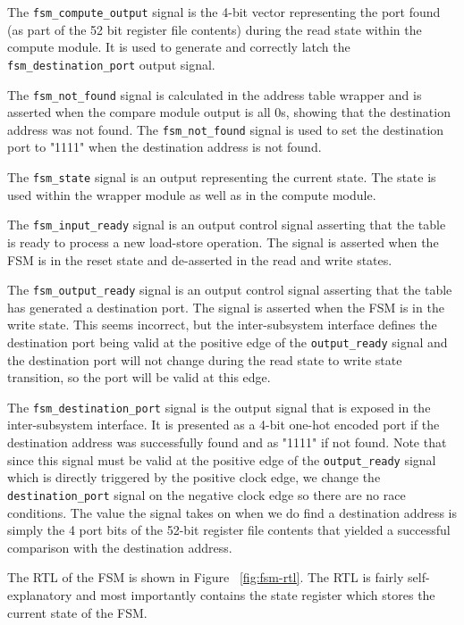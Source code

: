 \documentclass{article}
\begin{document}
The \texttt{fsm\_compute\_output} signal is the 4-bit vector representing the port found (as part of the 52 bit register file contents) during the read state within the compute module. It is used to generate and correctly latch the \texttt{fsm\_destination\_port} output signal.

The \texttt{fsm\_not\_found} signal is calculated in the address table wrapper and is asserted when the compare module output is all 0s, showing that the destination address was not found. The \texttt{fsm\_not\_found} signal is used to set the destination port to "1111" when the destination address is not found.

The \texttt{fsm\_state} signal is an output representing the current state. The state is used within the wrapper module as well as in the compute module.

The \texttt{fsm\_input\_ready} signal is an output control signal asserting that the table is ready to process a new load-store operation. The signal is asserted when the FSM is in the reset state and de-asserted in the read and write states.

The \texttt{fsm\_output\_ready} signal is an output control signal asserting that the table has generated a destination port. The signal is asserted when the FSM is in the write state. This seems incorrect, but the inter-subsystem interface defines the destination port being valid at the positive edge of the \texttt{output\_ready} signal and the destination port will not change during the read state to write state transition, so the port will be valid at this edge.

The \texttt{fsm\_destination\_port} signal is the output signal that is exposed in the inter-subsystem interface. It is presented as a 4-bit one-hot encoded port if the destination address was successfully found and as "1111" if not found. Note that since this signal must be valid at the positive edge of the \texttt{output\_ready} signal which is directly triggered by the positive clock edge, we change the \texttt{destination\_port} signal on the negative clock edge so there are no race conditions. The value the signal takes on when we do find a destination address is simply the 4 port bits of the 52-bit register file contents that yielded a successful comparison with the destination address.

The RTL of the FSM is shown in Figure ~\ref{fig:fsm-rtl}. The RTL is fairly self-explanatory and most importantly contains the state register which stores the current state of the FSM.
\end{document}
